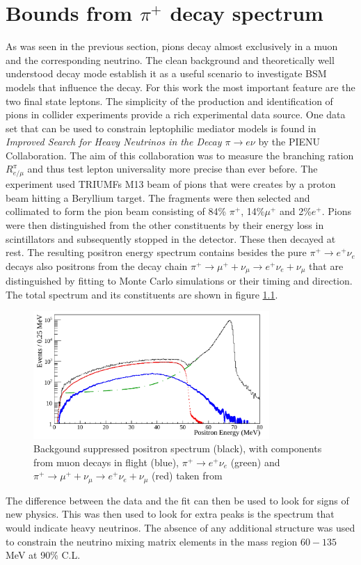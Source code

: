 \chapter{Bounds from \texorpdfstring{$\pi^+$}{pion} decay spectrum}
\label{ch:BoundsPI}
As was seen in the previous section, pions decay almost exclusively in a muon and the corresponding neutrino. The clean background and theoretically well understood decay mode establish it as a useful scenario to investigate BSM models that influence the decay. For this work the most important feature are the two final state leptons. 
The simplicity of the production and identification of pions in collider experiments provide a rich experimental data source. 
One data set that can be used to constrain leptophilic mediator models is found in \emph{Improved Search for Heavy Neutrinos in the Decay $\pi\rightarrow e\nu$} \cite{Aguilar-Arevalo:2017vlf} by the PIENU Collaboration. 
The aim of this collaboration was to measure the  branching ration $R_{e/\mu}^\pi$ and thus test lepton universality more precise than ever before. 
The experiment used TRIUMFs M13 beam of pions that were creates by a proton beam hitting a Beryllium target. The fragments were then selected and collimated to form the pion beam consisting of 84\% $\pi^+$, 14\%$\mu^+$ and 2\%$e^+$. 
Pions were then distinguished from the other constituents by their energy loss in scintillators and subsequently stopped in the detector. These then decayed at rest. 
The resulting positron energy spectrum contains besides the pure $\pi^+\rightarrow e^+\nu_e$ decays also positrons from the decay chain $\pi^+\rightarrow \mu^++\nu_\mu \rightarrow e^+ \nu_e +\nu_\mu$ that are distinguished by fitting to Monte Carlo simulations or their timing and direction. 
The total spectrum and its constituents are shown in figure \ref{fg:PiENuSpectrum}.
\begin{figure}[H]
  \centering
    \includegraphics[width=0.8\textwidth]{imgs/graph}
    \caption{Backgound suppressed positron spectrum (black), with components from muon decays in flight (blue), $\pi^+\rightarrow e^+\nu_e$ (green) and $\pi^+\rightarrow \mu^++\nu_\mu \rightarrow e^+ \nu_e +\nu_\mu$ (red)
    taken from \cite{Aguilar-Arevalo:2017vlf}}
    \label{fg:PiENuSpectrum}
\end{figure}
The difference between the data and the fit can then be used to look for signs of new physics. This was then used to look for extra peaks is the spectrum that would indicate heavy neutrinos. The absence of any additional structure was used to constrain the neutrino mixing matrix elements in the mass region $60-135$MeV at 90\% C.L.


